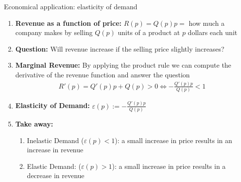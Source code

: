 \documentclass[9pt]{beamer}
\begin{document}
\begin{frame}{Economical application: elasticity of demand}

    \begin{enumerate}[leftmargin = 0.5cm, label = , rightmargin = 0.2cm]

        \item \textbf{Revenue as a function of price:} $R(p) = Q(p)p = $ how much a company makes by selling $Q(p)$ units of a product at $p$ dollars each unit

        \item \textbf{Question:} Will revenue increase if the selling price slightly increases?

        \item \textbf{Marginal Revenue:} By applying the product rule we can compute the derivative of the revenue function and answer the question
        \begin{align*}
            R'(p) = Q'(p)p + Q(p) > 0 \Longleftrightarrow - \frac{Q'(p)p}{Q(p)} < 1
        \end{align*}
        
        \item \textbf{Elasticity of Demand:} $\varepsilon(p) := -\frac{Q'(p)p}{Q(p)}$

        \item \textbf{Take away:}

        \begin{enumerate}[leftmargin = 0.5cm, label = $\bullet$, rightmargin = 0.2cm]
            
            \item Inelastic Demand ($\varepsilon(p) < 1$): a small increase in price results in an increase in revenue

            \item Elastic Demand: ($\varepsilon(p) > 1$): a small increase in price results in a decrease in revenue
            
        \end{enumerate}
    \end{enumerate}
    
\end{frame}

\end{document}
